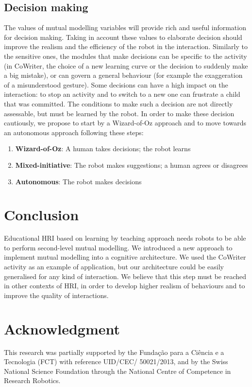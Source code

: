 \documentclass[conference]{IEEEtran}
\begin{document}
\subsection{Decision making}
\label{ssec:decision}
The values of mutual modelling variables will provide rich and useful information for decision making. 
Taking in account these values to elaborate decision should improve the realism and the efficiency of the robot in the interaction.
Similarly to the sensitive ones, the modules that make decisions can be specific to the activity (in CoWriter, the choice of a new learning curve or the decision to suddenly make a big mistake), or can govern a general behaviour (for example the exaggeration of a misunderstood gesture). Some decisions can have a high impact on the interaction: to stop an activity and to switch to a new one can frustrate a child that was committed. 
The conditions to make such a decision are not directly assessable, but must be learned by the robot. In order to make these decision cautiously, we propose to start by a Wizard-of-Oz approach and to move towards an autonomous approach following these steps: 
\begin{enumerate}
\item \textbf{Wizard-of-Oz}: A human takes decisions; the robot learns
\item \textbf{Mixed-initiative}: The robot makes suggestions; a human agrees or disagrees
\item \textbf{Autonomous}: The robot makes decisions
\end{enumerate}



\section{Conclusion}

Educational HRI based on learning by teaching approach needs robots to be able to perform second-level mutual modelling. 
We introduced a new approach to implement mutual modelling into a cognitive architecture. We used the CoWriter activity
as an example of application, but our architecture could be easily generalised for any kind of interaction.
We believe that this step must be reached in other contexts of HRI, in order to develop higher realism of behaviours
and to improve the quality of interactions. 


\section*{Acknowledgment}
This research was partially supported by the Funda\c{c}\~{a}o para a Ci\^{e}ncia
e a Tecnologia (FCT) with reference UID/CEC/ 50021/2013, and by the Swiss
National Science Foundation through the National Centre of Competence in
Research Robotics.







\end{document}
